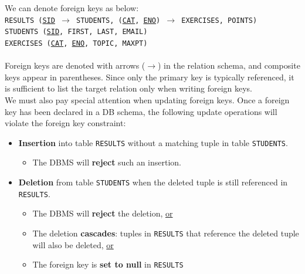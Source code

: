 \documentclass{article}
\begin{document}
We can denote foreign keys as below:
\\\texttt{RESULTS (\underline{SID} $\to$ STUDENTS, (\underline{CAT}, \underline{ENO}) $\to$ EXERCISES, POINTS)}
\\\texttt{STUDENTS (\underline{SID}, FIRST, LAST, EMAIL)}
\\\texttt{EXERCISES (\underline{CAT}, \underline{ENO}, TOPIC, MAXPT)}
\\[1ex]
\\Foreign keys are denoted with arrows ($\to$) in the relation schema, and composite keys appear in parentheses. Since only the primary key is typically referenced, it is sufficient to list the target relation only when writing foreign keys.
\\We must also pay special attention when updating foreign keys. Once a foreign key has been declared in a DB schema, the following update operations will violate the foreign key constraint:
\begin{itemize}
    \item \textbf{Insertion} into table \texttt{RESULTS} without a matching tuple in table \texttt{STUDENTS}.
    \begin{itemize}
        \item The DBMS will \textbf{reject} such an insertion.
    \end{itemize}
    \item \textbf{Deletion} from table \texttt{STUDENTS} when the deleted tuple is still referenced in \texttt{RESULTS}.
    \begin{itemize}
        \item The DBMS will \textbf{reject} the deletion, \underline{or}
        \item The deletion \textbf{cascades}: tuples in \texttt{RESULTS} that reference the deleted tuple will also be deleted, \underline{or}
        \item The foreign key is \textbf{set to null} in \texttt{RESULTS}
    \end{itemize}
\end{itemize}
\end{document}
